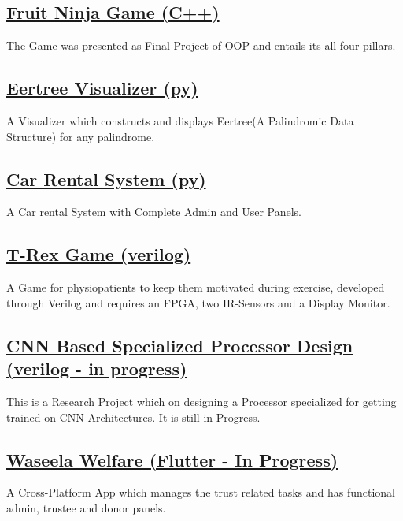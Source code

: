 \documentclass[]{plushcv}
\begin{document}
\begin{minipage}[t]{0.30\textwidth}
    \subsection{\href{https://github.com/smabbasht/CS224-OOP-FruitNinjaGame-cpp}{\textbf{Fruit Ninja Game (C++)}}}
    The Game was presented as Final Project of OOP and entails its all four pillars.

    \subsection{\href{https://github.com/smabbasht/CS201-DataSructures-II-Project-eertree}{\textbf{Eertree Visualizer (py)}}}
    A Visualizer which constructs and displays Eertree(A Palindromic Data Structure) for any palindrome.

    \subsection{\href{https://github.com/smabbasht/HU-DSA-Project}{\textbf{Car Rental System (py)}}}
    A Car rental System with Complete Admin and User Panels.

    \subsection{\href{https://github.com/smabbasht/CS370-DIgital-Logic-Design-Project}{\textbf{T-Rex Game (verilog)}}}
    A Game for physiopatients to keep them motivated during exercise, developed through Verilog and requires an FPGA, two IR-Sensors and a Display Monitor.
    
    \subsection{\href{https://github.com/smabbasht/CS330-ResearchProject-ComputerArchitecture}{CNN Based Specialized Processor Design (verilog - in progress)}}
    This is a Research Project which on designing a Processor specialized for getting trained on CNN Architectures. It is still in Progress.

    \subsection{\href{https://github.com/smabbasht/Waseela-Welfare}{\textbf{Waseela Welfare (Flutter -  In Progress)}}}
    A Cross-Platform App which manages the trust related tasks and has functional admin, trustee and donor panels.
 


\end{minipage} 
\end{document}
